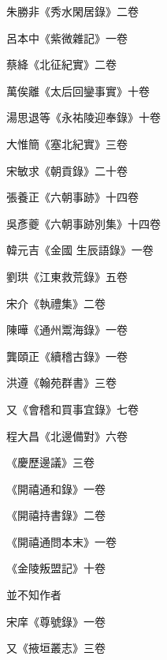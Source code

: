 \begin{pinyinscope}
 朱勝非《秀水閑居錄》二卷



 呂本中《紫微雜記》一卷



 蔡絳《北征紀實》二卷



 萬俟離《太后回鑾事實》十卷



 湯思退等《永祐陵迎奉錄》十卷



 大惟簡《塞北紀實》三卷



 宋敏求《朝貢錄》二十卷



 張養正《六朝事跡》十四卷



 吳彥夔《六朝事跡別集》十四卷



 韓元吉《金國
 生辰語錄》一卷



 劉珙《江東救荒錄》五卷



 宋介《執禮集》二卷



 陳曄《通州鬻海錄》一卷



 龔頤正《續稽古錄》一卷



 洪遵《翰苑群書》三卷



 又《會稽和買事宜錄》七卷



 程大昌《北邊備對》六卷



 《慶歷邊議》三卷



 《開禧通和錄》一卷



 《開禧持書錄》二卷



 《開禧通問本末》一卷



 《金陵叛盟記》十卷



 並不知作者



 宋庠《尊號錄》一卷



 又《掖垣叢志》三卷




\end{pinyinscope}
